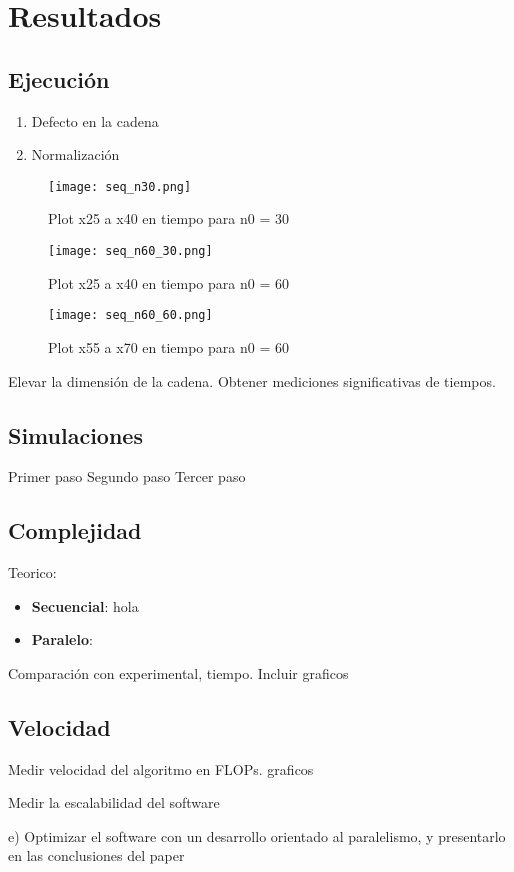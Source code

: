\section{Resultados}

\subsection{Ejecución}

\begin{enumerate}
	\item Defecto en la cadena
	      	          
	\item Normalización
	      	          
\end{enumerate}

\begin{figure}
	\centering
	\texttt{[image: seq\_n30.png]}
	\caption{Plot x25 a x40 en tiempo para n0 = 30}
\end{figure}

\begin{figure}
	\centering
	\texttt{[image: seq\_n60\_30.png]}
	\caption{Plot x25 a x40 en tiempo para n0 = 60}
\end{figure}

\begin{figure}
	\centering
	\texttt{[image: seq\_n60\_60.png]}
	\caption{Plot x55 a x70 en tiempo para n0 = 60}
\end{figure}



Elevar la dimensión de la cadena. Obtener mediciones significativas de tiempos.

\subsection{Simulaciones}
Primer paso
Segundo paso
Tercer paso

\subsection{Complejidad}

Teorico:

\begin{itemize}
	\item \textbf{Secuencial}:
	      hola
	\item \textbf{Paralelo}:
	      	          
\end{itemize}

Comparación con experimental, tiempo. Incluir graficos

\subsection{Velocidad}

Medir velocidad del algoritmo en FLOPs. graficos

Medir la escalabilidad del software

e) Optimizar el software con un desarrollo orientado al paralelismo, y presentarlo
en las conclusiones del paper